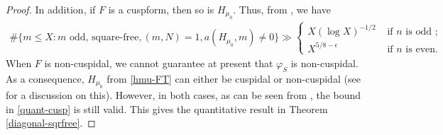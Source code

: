 \documentclass[11pt]{amsart}
\numberwithin{equation}{section}
\begin{document}
\begin{proof}
In addition, if $F$ is a cuspform, then so is $H_{\mu_0}$. Thus, from \cite[Theorem 4.5 and Theorem 4.6]{boche-das}, we have
\begin{align}\label{quant-cusp}
   \#\{m\le X: m \text{ odd, square-free}, (m,N)=1, a(H_{\mu_0}, m)\neq 0\} \gg\begin{cases} X(\log X)^{-1/2} &\text{ if } n \text{ is odd };  \\ 
X^{5/8 - \epsilon} &\text{ if } n \text{ is even}.
\end{cases}
\end{align}
When $F$ is non-cuspidal, we cannot guarantee at present that $\varphi_S$ is non-cuspidal. As a consequence, $H_{\mu_0}$ from \eqref{hmu-FT} can either be cuspidal or non-cuspidal (see \cite{boche-das} for a discussion on this). However, in both cases, as can be seen from \cite[Theorem 4.6]{boche-das}, the bound in \eqref{quant-cusp} is still valid. This gives the quantitative result in Theorem \ref{diagonal-sqrfree}.
\end{proof}
\end{document}
